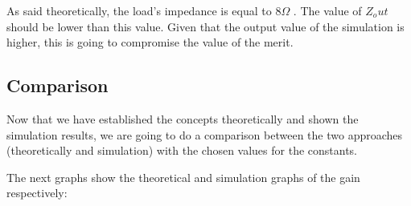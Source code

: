%

%

As said theoretically, the load's impedance is equal to 8$\Omega$ . The value of $Z_out$ should be lower than this value. Given that the output value of the simulation is higher, this is going to compromise the value of the merit.

\subsection{Comparison}

Now that we have established the concepts theoretically and shown the simulation results, we are going to do a comparison between the two approaches (theoretically and simulation) with the chosen values for the constants. \par
The next graphs show the theoretical and simulation graphs of the gain respectively:


